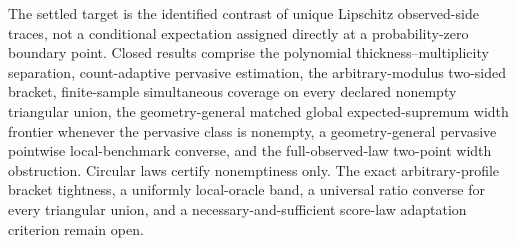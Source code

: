 The settled target is the identified contrast of unique Lipschitz observed-side traces, not a conditional expectation assigned directly at a probability-zero boundary point. Closed results comprise the polynomial thickness--multiplicity separation, count-adaptive pervasive estimation, the arbitrary-modulus two-sided bracket, finite-sample simultaneous coverage on every declared nonempty triangular union, the geometry-general matched global expected-supremum width frontier whenever the pervasive class is nonempty, a geometry-general pervasive pointwise local-benchmark converse, and the full-observed-law two-point width obstruction. Circular laws certify nonemptiness only. The exact arbitrary-profile bracket tightness, a uniformly local-oracle band, a universal ratio converse for every triangular union, and a necessary-and-sufficient score-law adaptation criterion remain open.